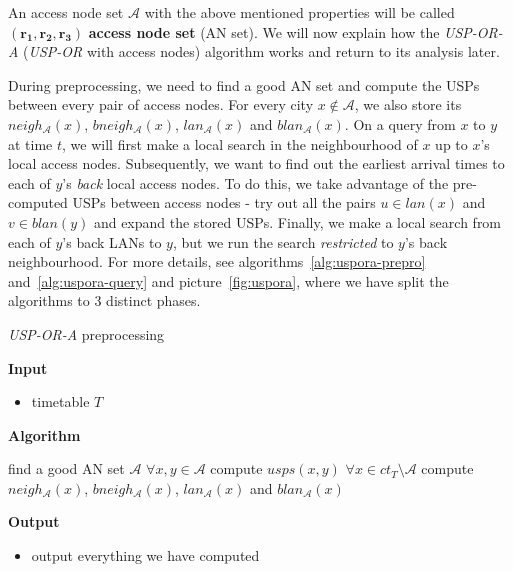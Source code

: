 	\noindent An access node set $\mathcal{A}$ with the above mentioned properties will be called $\bm{(r_{1}, r_{2}, r_{3})}$ \textbf{access node set} (AN set). We will now explain how the \textit{USP-OR-A} (\textit{USP-OR} with access nodes) algorithm works and return to its analysis later. 
	
	During preprocessing, we need to find a good AN set and compute the USPs between every pair of access nodes. For every city $x \not \in \mathcal{A}$, we also store its $neigh_{\mathcal{A}}(x)$, $bneigh_{\mathcal{A}}(x)$, $lan_{\mathcal{A}}(x)$ and $blan_{\mathcal{A}}(x)$. On a query from $x$ to $y$ at time $t$, we will first make a local search in the neighbourhood of $x$ up to $x$'s local access nodes. Subsequently, we want to find out the earliest arrival times to each of $y$'s \textit{back} local access nodes. To do this, we take advantage of the pre-computed USPs between access nodes - try out all the pairs $u \in lan(x)$ and $v \in blan(y)$ and expand the stored USPs. Finally, we make a local search from each of $y$'s back LANs to $y$, but we run the search \textit{restricted} to $y$'s back neighbourhood. For more details, see algorithms~\ref{alg:uspora-prepro} and~\ref{alg:uspora-query} and picture~\ref{fig:uspora}, where we have split the algorithms to 3 distinct phases.
	
	\color{algcolor}
	\begin{algorithm}[H]
		\color{inalgcolor}
		\caption{\textit{USP-OR-A} preprocessing}
		\label{alg:uspora-prepro}
		\textbf{Input} 
		\begin{itemize}
			\item timetable $T$
		\end{itemize}
		\textbf{Algorithm}
		\begin{algorithmic}
			\STATE find a good AN set $\mathcal{A}$
			\STATE $\forall x, y \in \mathcal{A}$ compute $usps(x, y)$
			\STATE $\forall x \in ct_{T} \setminus \mathcal{A}$ compute $neigh_{\mathcal{A}}(x)$, $bneigh_{\mathcal{A}}(x)$, $lan_{\mathcal{A}}(x)$ and $blan_{\mathcal{A}}(x)$
		\end{algorithmic}
		\textbf{Output}
		\begin{itemize}
			\item output everything we have computed
		\end{itemize}
	\end{algorithm}
	\color{black}
	
